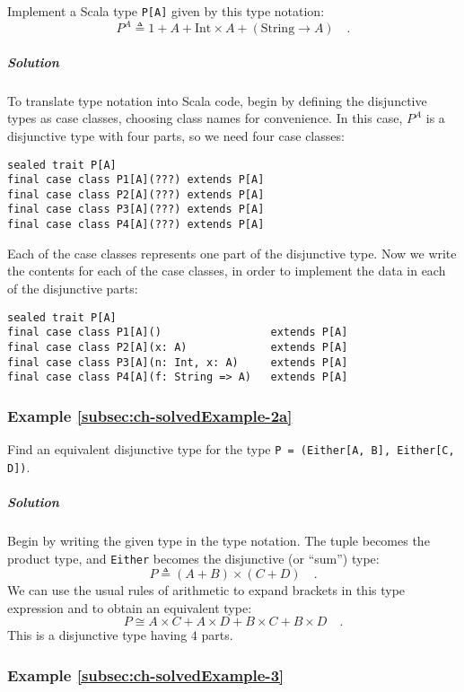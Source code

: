 Implement a Scala type \lstinline!P[A]! given by this type notation:
\[
P^{A}\triangleq1+A+\text{Int}\times A+(\text{String}\rightarrow A)\quad.
\]


\subparagraph{Solution}

To translate type notation into Scala code, begin by defining the
disjunctive types as case classes, choosing class names for convenience.
In this case, $P^{A}$ is a disjunctive type with four parts, so we
need four case classes:
\begin{lstlisting}
sealed trait P[A]
final case class P1[A](???) extends P[A]
final case class P2[A](???) extends P[A]
final case class P3[A](???) extends P[A]
final case class P4[A](???) extends P[A]
\end{lstlisting}
Each of the case classes represents one part of the disjunctive type.
Now we write the contents for each of the case classes, in order to
implement the data in each of the disjunctive parts:
\begin{lstlisting}
sealed trait P[A]
final case class P1[A]()                 extends P[A]
final case class P2[A](x: A)             extends P[A]
final case class P3[A](n: Int, x: A)     extends P[A]
final case class P4[A](f: String => A)   extends P[A]
\end{lstlisting}


\subsubsection{Example \label{subsec:ch-solvedExample-2a}\ref{subsec:ch-solvedExample-2a}}

Find an equivalent disjunctive type for the type \lstinline!P = (Either[A, B], Either[C, D])!.

\subparagraph{Solution}

Begin by writing the given type in the type notation. The tuple becomes
the product type, and \lstinline!Either! becomes the disjunctive
(or \textsf{``}sum\textsf{''}) type:
\[
P\triangleq(A+B)\times(C+D)\quad.
\]
We can use the usual rules of arithmetic to expand brackets in this
type expression and to obtain an equivalent type:
\[
P\cong A\times C+A\times D+B\times C+B\times D\quad.
\]
This is a disjunctive type having $4$ parts.

\subsubsection{Example \label{subsec:ch-solvedExample-3}\ref{subsec:ch-solvedExample-3}}

